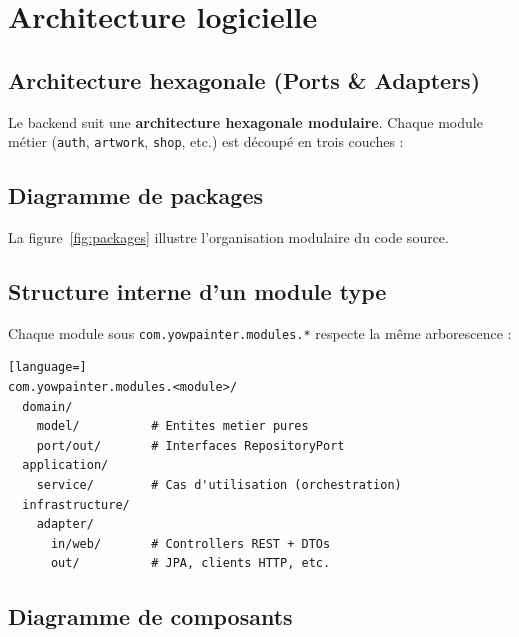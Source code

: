 \chapter{Architecture logicielle}

\section{Architecture hexagonale (Ports \& Adapters)}

Le backend suit une \textbf{architecture hexagonale modulaire}. Chaque module métier
(\texttt{auth}, \texttt{artwork}, \texttt{shop}, etc.) est découpé en trois couches :


\section{Diagramme de packages}

La figure~\ref{fig:packages} illustre l'organisation modulaire du code source.


\section{Structure interne d'un module type}

Chaque module sous \texttt{com.yowpainter.modules.*} respecte la même arborescence :

\begin{lstlisting}[language=]
com.yowpainter.modules.<module>/
  domain/
    model/          # Entites metier pures
    port/out/       # Interfaces RepositoryPort
  application/
    service/        # Cas d'utilisation (orchestration)
  infrastructure/
    adapter/
      in/web/       # Controllers REST + DTOs
      out/          # JPA, clients HTTP, etc.
\end{lstlisting}

\section{Diagramme de composants}



